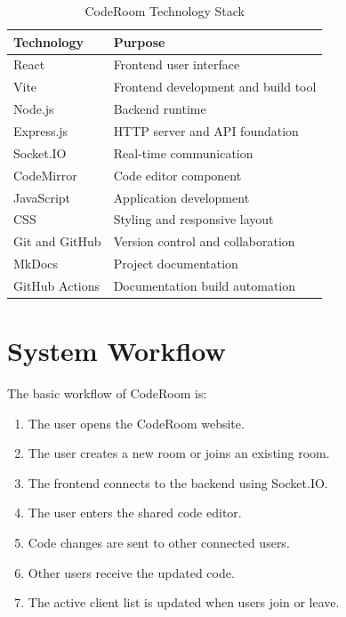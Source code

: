 \documentclass[12pt,a4paper,oneside]{report}
\begin{document}
\begin{table}[H]
\centering
\small
\begin{tabular}{p{4cm}p{8cm}}
\toprule
\textbf{Technology} & \textbf{Purpose}\\
\midrule
React & Frontend user interface\\
Vite & Frontend development and build tool\\
Node.js & Backend runtime\\
Express.js & HTTP server and API foundation\\
Socket.IO & Real-time communication\\
CodeMirror & Code editor component\\
JavaScript & Application development\\
CSS & Styling and responsive layout\\
Git and GitHub & Version control and collaboration\\
MkDocs & Project documentation\\
GitHub Actions & Documentation build automation\\
\bottomrule
\end{tabular}
\caption{CodeRoom Technology Stack}
\label{tab:techstack}
\end{table}

\section{System Workflow}

The basic workflow of CodeRoom is:

\begin{enumerate}
    \item The user opens the CodeRoom website.
    \item The user creates a new room or joins an existing room.
    \item The frontend connects to the backend using Socket.IO.
    \item The user enters the shared code editor.
    \item Code changes are sent to other connected users.
    \item Other users receive the updated code.
    \item The active client list is updated when users join or leave.
\end{enumerate}

\end{document}
